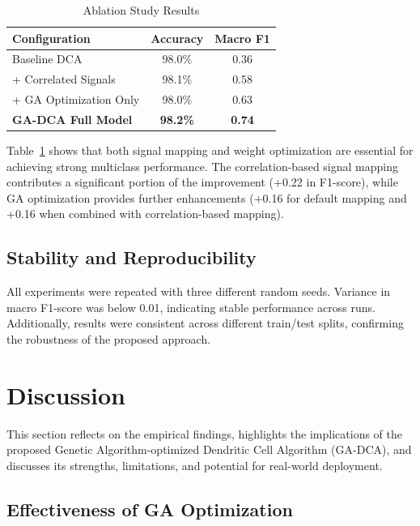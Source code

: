 \documentclass[conference]{IEEEtran}
\begin{document}
\begin{table}[h]
  \centering
  \caption{Ablation Study Results}
  \label{tab:ablation_study}
  \begin{tabular}{lcc}
    \toprule
    \textbf{Configuration} & \textbf{Accuracy} & \textbf{Macro F1} \\
    \midrule
    Baseline DCA                 & 98.0\% & 0.36 \\
    + Correlated Signals         & 98.1\% & 0.58 \\
    + GA Optimization Only       & 98.0\% & 0.63 \\
    \textbf{GA-DCA Full Model}   & \textbf{98.2\%} & \textbf{0.74} \\
    \bottomrule
  \end{tabular}
\end{table}

Table~\ref{tab:ablation_study} shows that both signal mapping and weight optimization
are essential for achieving strong multiclass performance. The correlation-based
signal mapping contributes a significant portion of the improvement (+0.22 in F1-score),
while GA optimization provides further enhancements (+0.16 for default mapping and
+0.16 when combined with correlation-based mapping).

\subsection{Stability and Reproducibility}

All experiments were repeated with three different random seeds.
Variance in macro F1-score was below 0.01, indicating stable
performance across runs. Additionally, results were consistent across
different train/test splits, confirming the robustness of the
proposed approach.

\section{Discussion}

This section reflects on the empirical findings, highlights the
implications of the proposed Genetic Algorithm-optimized Dendritic
Cell Algorithm (GA-DCA), and discusses its strengths, limitations,
and potential for real-world deployment.

\subsection{Effectiveness of GA Optimization}
\end{document}
